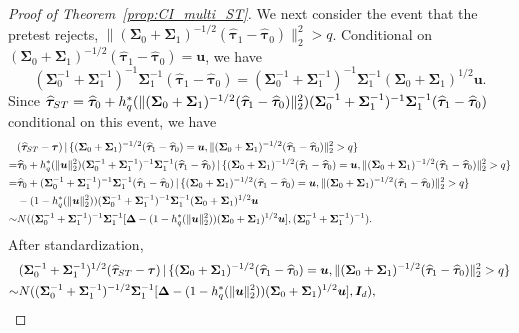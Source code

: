 \documentclass[10pt,a4paper]{amsart}
\def\given{\,|\,}
\newcommand{\htau}{\widehat\tau}
\begin{document}
\begin{proof}[Proof of Theorem~\ref{prop:CI_multi_ST}]
We next consider the event that the pretest rejects, $\lVert (\bm{\Sigma}_0+ \bm{\Sigma}_1)^{-1/2}(\bm{\htau}_1 - \bm{\htau}_0) \rVert_2^2 > q$. Conditional on $(\bm{\Sigma}_0+ \bm{\Sigma}_1)^{-1/2}(\bm{\htau}_1 - \bm{\htau}_0) = \bm{u}$, we have
\[
  (\bm{\Sigma}_0^{-1} + \bm{\Sigma}_1^{-1})^{-1} \bm{\Sigma}_1^{-1} (\bm{\htau}_1 - \bm{\htau}_0) = (\bm{\Sigma}_0^{-1} + \bm{\Sigma}_1^{-1})^{-1} \bm{\Sigma}_1^{-1} (\bm{\Sigma}_0+ \bm{\Sigma}_1)^{1/2} \bm{u}.
\]
Since $\bm{\htau}_{\rm ST} = \bm{\htau}_0 + h_q^*(\lVert (\bm{\Sigma}_0+ \bm{\Sigma}_1)^{-1/2}(\bm{\htau}_1 - \bm{\htau}_0) \rVert_2^2)(\bm{\Sigma}_0^{-1} + \bm{\Sigma}_1^{-1})^{-1}\bm{\Sigma}_1^{-1}(\bm{\htau}_1 - \bm{\htau}_0)$ conditional on this event, we have
\begin{align*}
  &(\bm{\htau}_{\rm ST} - \bm{\tau}) \given \{(\bm{\Sigma}_0+ \bm{\Sigma}_1)^{-1/2}(\bm{\htau}_1 - \bm{\htau}_0) = \bm{u}, \lVert (\bm{\Sigma}_0+ \bm{\Sigma}_1)^{-1/2}(\bm{\htau}_1 - \bm{\htau}_0) \rVert_2^2 > q\} \\
  =& \bm{\htau}_0 + h_q^*(\lVert \bm{u} \rVert_2^2)(\bm{\Sigma}_0^{-1} + \bm{\Sigma}_1^{-1})^{-1}\bm{\Sigma}_1^{-1}(\bm{\htau}_1 - \bm{\htau}_0) \given \{(\bm{\Sigma}_0+ \bm{\Sigma}_1)^{-1/2}(\bm{\htau}_1 - \bm{\htau}_0) = \bm{u}, \lVert (\bm{\Sigma}_0+ \bm{\Sigma}_1)^{-1/2}(\bm{\htau}_1 - \bm{\htau}_0) \rVert_2^2 > q\}\\
  =& \bm{\htau}_0 + (\bm{\Sigma}_0^{-1} + \bm{\Sigma}_1^{-1})^{-1} \bm{\Sigma}_1^{-1} (\bm{\htau}_1 - \bm{\htau}_0) \given \{(\bm{\Sigma}_0+ \bm{\Sigma}_1)^{-1/2}(\bm{\htau}_1 - \bm{\htau}_0) = \bm{u}, \lVert (\bm{\Sigma}_0+ \bm{\Sigma}_1)^{-1/2}(\bm{\htau}_1 - \bm{\htau}_0) \rVert_2^2 > q\}\\
  &- (1-h_q^*(\lVert \bm{u} \rVert_2^2))(\bm{\Sigma}_0^{-1} + \bm{\Sigma}_1^{-1})^{-1} \bm{\Sigma}_1^{-1} (\bm{\Sigma}_0+ \bm{\Sigma}_1)^{1/2} \bm{u}\\
  \sim& N((\bm{\Sigma}_0^{-1} + \bm{\Sigma}_1^{-1})^{-1} \bm{\Sigma}_1^{-1} [\bm{\Delta} - (1-h_q^*(\lVert \bm{u} \rVert_2^2))(\bm{\Sigma}_0+ \bm{\Sigma}_1)^{1/2} \bm{u}], (\bm{\Sigma}_0^{-1} + \bm{\Sigma}_1^{-1})^{-1} ).
\end{align*}
After standardization,
\begin{align*}
  &(\bm{\Sigma}_0^{-1} + \bm{\Sigma}_1^{-1})^{1/2} (\bm{\htau}_{\rm ST} - \bm{\tau}) \given \{(\bm{\Sigma}_0+ \bm{\Sigma}_1)^{-1/2}(\bm{\htau}_1 - \bm{\htau}_0) = \bm{u}, \lVert (\bm{\Sigma}_0+ \bm{\Sigma}_1)^{-1/2}(\bm{\htau}_1 - \bm{\htau}_0) \rVert_2^2 > q\} \\
  \sim& N((\bm{\Sigma}_0^{-1} + \bm{\Sigma}_1^{-1})^{-1/2} \bm{\Sigma}_1^{-1} [\bm{\Delta} - (1-h_q^*(\lVert \bm{u} \rVert_2^2))(\bm{\Sigma}_0+ \bm{\Sigma}_1)^{1/2} \bm{u}], \bm{I}_d),

\end{align*}
\end{proof}
\end{document}
